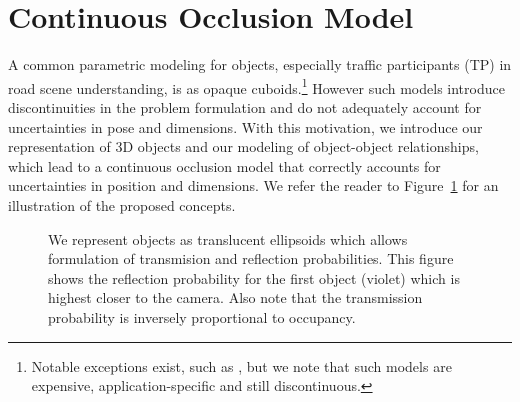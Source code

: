 \section{Continuous Occlusion Model}
\label{sec:setup}



\def\TP{TP}
A common parametric modeling for objects, especially traffic participants (TP) in road scene understanding, is as opaque cuboids.\footnote{Notable exceptions exist, such as \cite{Zia_etal_2014}, but we note that such models are expensive, application-specific and still discontinuous.} However such models introduce discontinuities in the problem formulation and do not adequately account for uncertainties in pose and dimensions. With this motivation, we introduce our representation of 3D objects and our modeling of object-object relationships, which lead to a continuous occlusion model that correctly accounts for uncertainties in position and dimensions. We refer the reader to Figure~\ref{fig:reflectiontransimission} for an illustration of the proposed concepts.


\begin{figure}
  \usetikzlibrary{calc}
  \centering
  \begin{tikzpicture}
    
  \end{tikzpicture}
  \vspace{-0.3cm}
  \caption{\small We represent objects as translucent ellipsoids which allows formulation of transmision and reflection probabilities. This figure shows the reflection probability for the first object (violet) which is highest closer to the camera. Also note that the transmission probability is inversely proportional to occupancy.}
  \label{fig:reflectiontransimission}
  \vspace{-0.3cm}
\end{figure}

